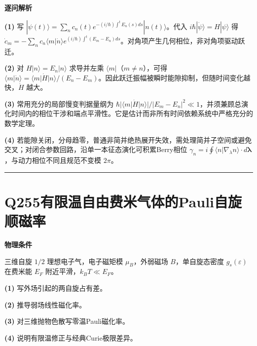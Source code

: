 \documentclass[UTF8,a4paper,11pt,oneside,openany]{ctexbook}
\begin{document}
\par\medskip\noindent\textbf{逐问解析}
\par\noindent\textbf{(1)} 写 \(|\psi(t)\rangle=\sum_n c_n(t)e^{-(i/\hbar)\int^t E_n(s)ds}|n(t)\rangle\)。代入 \(i\hbar|\dot\psi\rangle=H|\psi\rangle\) 得 \(\dot c_m=-\sum_nc_n\langle m|\dot n\rangle e^{(i/\hbar)\int^t(E_m-E_n)ds}\)。对角项产生几何相位，非对角项驱动跃迁。
\par\noindent\textbf{(2)} 对 \(H|n\rangle=E_n|n\rangle\) 求导并左乘 \(\langle m|\)（\(m\ne n\)），可得 \(\langle m|\dot n\rangle=\langle m|\dot H|n\rangle/(E_n-E_m)\)。因此跃迁振幅被瞬时能隙抑制，但随时间变化越快，\(\dot H\) 越大。
\par\noindent\textbf{(3)} 常用充分的局部慢变判据量纲为 \(\hbar|\langle m|\dot H|n\rangle|/|E_m-E_n|^2\ll1\)，并须兼顾总演化时间内的相位干涉和端点平滑性。它是估计而非所有时间依赖系统中严格充分的数学定理。
\par\noindent\textbf{(4)} 若能隙关闭，分母趋零，普通非简并绝热展开失效，需处理简并子空间或避免交叉；对闭合参数回路，沿单一本征态演化可积累Berry相位 \(\gamma_n=i\oint\langle n|\nabla_\lambda n\rangle\cdot d\boldsymbol\lambda\)，与动力相位不同且规范不变模 \(2\pi\)。

\par\bigskip\hrule\bigskip
\section*{Q255\quad 有限温自由费米气体的Pauli自旋顺磁率}
\textbf{物理条件}\par 三维自旋 \(1/2\) 理想电子气，电子磁矩模 \(\mu_B\)，外弱磁场 \(B\)，单自旋态密度 \(g_s(\varepsilon)\) 在费米能 \(E_F\) 附近平滑，\(k_BT\ll E_F\)。
\par\noindent\textbf{(1)} 写外场引起的两自旋占有差。
\par\noindent\textbf{(2)} 推导弱场线性磁化率。
\par\noindent\textbf{(3)} 对三维抛物色散写零温Pauli磁化率。
\par\noindent\textbf{(4)} 说明有限温修正与经典Curie极限差异。
\end{document}
